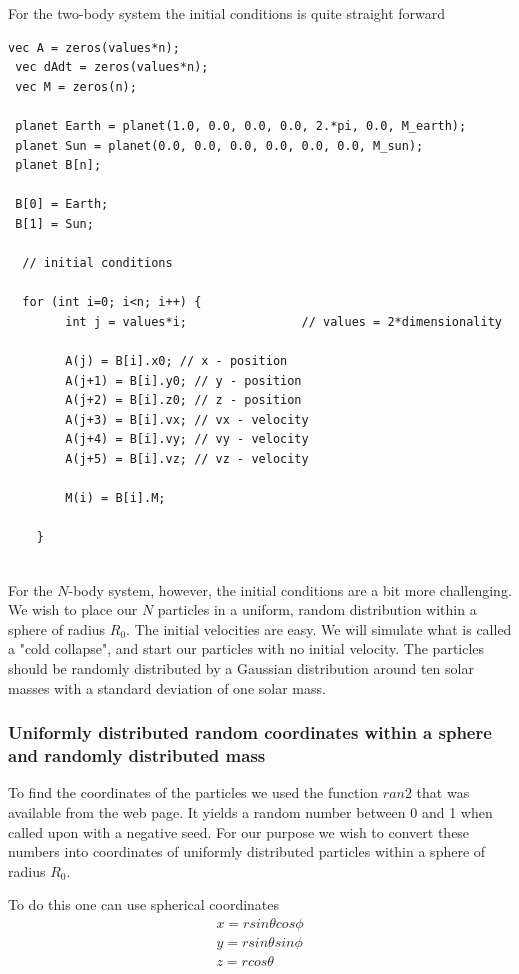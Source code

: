 \documentclass[a4paper,12pt, english]{article}
\begin{document}
For the two-body system the initial conditions is quite straight forward

 \begin{lstlisting}[title={Initial conditions two-body system}]
 vec A = zeros(values*n);
 vec dAdt = zeros(values*n);
 vec M = zeros(n);

 planet Earth = planet(1.0, 0.0, 0.0, 0.0, 2.*pi, 0.0, M_earth);
 planet Sun = planet(0.0, 0.0, 0.0, 0.0, 0.0, 0.0, M_sun);
 planet B[n];

 B[0] = Earth;
 B[1] = Sun;

  // initial conditions

  for (int i=0; i<n; i++) {
        int j = values*i;                // values = 2*dimensionality
       
        A(j) = B[i].x0; // x - position
        A(j+1) = B[i].y0; // y - position
        A(j+2) = B[i].z0; // z - position
        A(j+3) = B[i].vx; // vx - velocity
        A(j+4) = B[i].vy; // vy - velocity
        A(j+5) = B[i].vz; // vz - velocity

        M(i) = B[i].M;
        
    }
 
 \end{lstlisting}
 
 
For the $N$-body system, however, the initial conditions are a bit more challenging. We wish to place our $N$ particles in a uniform, random distribution within a sphere of radius $R_0$. The initial velocities are easy. We will simulate what is called a "cold collapse", and start our particles with no initial velocity. The particles should be randomly distributed by a Gaussian distribution around ten solar masses with a standard deviation of one solar mass.


\subsubsection*{Uniformly distributed random coordinates within a sphere and randomly distributed mass}

To find the coordinates of the particles we used the function $ran2$ that was available from the web page. It yields a random number between 0 and 1 when called upon with a negative seed. For our purpose we wish to convert these numbers into coordinates of uniformly distributed particles within a sphere of radius $R_0$.

To do this one can use spherical coordinates
\begin{align}
x = r sin \theta cos \phi \\
y = r sin \theta sin \phi \\
z = r cos \theta
\end{align}
\end{document}
